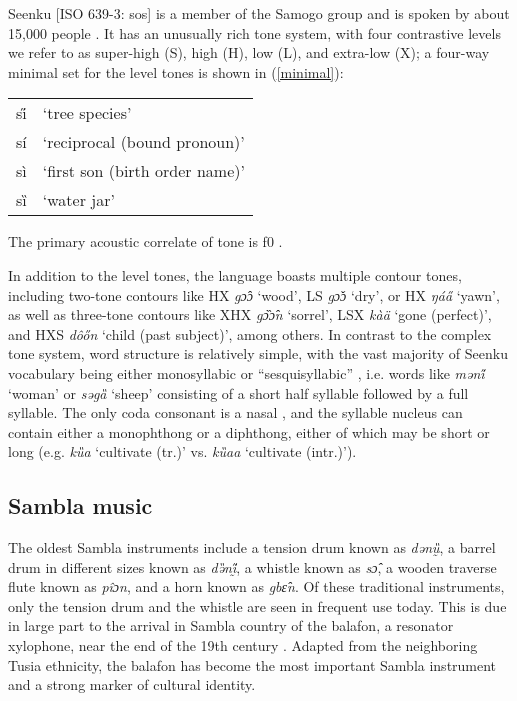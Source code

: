 \documentclass[output=paper]{langscibook}
\begin{document}
Seenku [ISO 639-3: sos] is a member of the Samogo group and is spoken by about 15,000 people \citep{McPherson2020}. It has an unusually rich tone system, with four contrastive levels we refer to as super-high (S), high (H), low (L), and extra-low (X); a four-way minimal set for the level tones is shown in (\ref{minimal}):

\begin{exe}
  \ex\label{minimal} \begin{tabular}[t]{ll}
  si̋ &  `tree species' \\
sí  &  `reciprocal (bound pronoun)' \\
sì &  `first son (birth order name)' \\
sȉ &  `water jar'   \\
  \end{tabular}
\end{exe}




The primary acoustic correlate of tone is f0 \citep{McPherson2019b}.

In addition to the level tones, the language boasts multiple contour tones, including two-tone contours like HX \textit{gɔ̂ɔ} `wood', LS \textit{gɔ̌ɔ} `dry', or HX \textit{ŋáa̋} `yawn', as well as three-tone contours like XHX \textit{gɔ̏ɔ̂n} `sorrel', LSX \textit{kàä} `gone (perfect)', and HXS \textit{dôőn} `child (past subject)', among others. In contrast to the complex tone system, word structure is relatively simple, with the vast majority of Seenku vocabulary being either monosyllabic or ``sesquisyllabic'' \citep{Matisoff1990,Pittayaporn2015}, i.e. words like \textit{məni̋} `woman' or \textit{səgȁ} `sheep' consisting of a short half syllable followed by a full syllable. The only coda consonant is a nasal \citep{McPherson2020}, and the syllable nucleus can contain either a monophthong or a diphthong, either of which may be short or long (e.g. \textit{kȕa} `cultivate (tr.)' vs. \textit{kȕaa} `cultivate (intr.)').

\subsection{Sambla music}

The oldest Sambla instruments include a tension drum known as \textit{dənṵ̏}, a barrel drum in different sizes known as \textit{də̏nḭ̋}, a whistle known as \textit{sɔ̂}, a wooden traverse flute known as \textit{pîɔn}, and a horn known as \textit{gbɛ̂n}. Of these traditional instruments, only the tension drum and the whistle are seen in frequent use today. This is due in large part to the arrival in Sambla country of the balafon, a resonator xylophone, near the end of the 19th century \citep{Strand2009}. Adapted from the neighboring Tusia ethnicity, the balafon has become the most important Sambla instrument and a strong marker of cultural identity.
\end{document}
